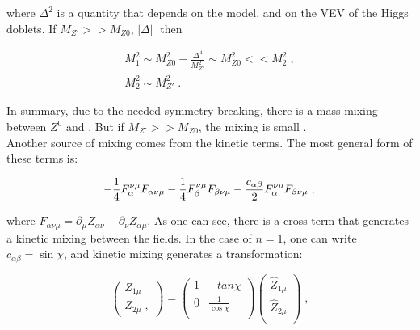 \noindent where $\Delta^{2}$ is a quantity that depends on the model, and on the VEV of the 
Higgs doblets. If $M_{Z\prime} >> M_{Z 0}$, $|\Delta| \;$ then

\begin{equation}
\begin{split}
 M_{1}^{2} \sim M_{Z 0}^{2} - \frac{\Delta^{4}}{M_{Z\prime}^{2}} \sim M_{Z 0}^{2} << M_{2}^{2} \; , \\
 M_{2}^{2} \sim M_{Z\prime}^{2} \; .
\end{split}
\end{equation}

\noindent In summary, due to the needed symmetry breaking, there is a mass mixing between
$Z^{0}$ and \Zprime. But if $M_{Z\prime} >> M_{Z 0}$, the mixing is small \cite{ZprimeMixing}.\\

\noindent Another source of mixing comes from the kinetic terms. The most general form of these terms is:

\begin{equation}
-\frac{1}{4}F_{\alpha}^{\nu\mu}F_{\alpha\nu\mu} -\frac{1}{4}F_{\beta}^{\nu\mu}F_{\beta\nu\mu} -\frac{c_{\alpha\beta}}{2}F_{\alpha}^{\nu\mu}F_{\beta\nu\mu} \; , \\
\end{equation}

\noindent where $F_{\alpha\nu\mu} = \partial_{\mu}Z_{\alpha \nu} - \partial_{\nu}Z_{\alpha \mu}$. As one can see, there is a 
cross term that generates a kinetic mixing between the fields. In the case 
of $n = 1$,  one can write $c_{\alpha\beta} = \sin \chi$, and kinetic
mixing generates a transformation:

\begin{equation}
 \left(
 \begin{matrix}
  Z_{1 \mu}  \\
  Z_{2 \mu} \; ,
 \end{matrix}
\right)
 = 
\left(
 \begin{matrix}
  1    & -tan \chi      \\
  0    & \frac{1}{\cos \chi} \\
 \end{matrix}
\right)
 \left(
 \begin{matrix}
  \hat{Z}_{1 \mu}  \\
  \hat{Z}_{2 \mu} \\
 \end{matrix}
\right) \; ,
 \end{equation}

